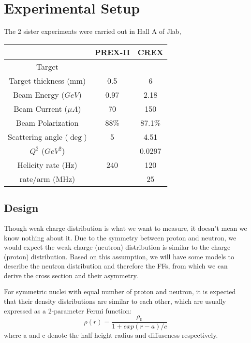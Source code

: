 \section{Experimental Setup}
The 2 sister experiments were carried out in Hall A of Jlab, 

\begin{table}[h]
    \centering
    \begin{tabular}{c | c c }
	\hline
	&   PREX-II & CREX  \\
	\hline
	Target	& \Pb	& \Ca	\\
	Target thickness (mm)	& 0.5	& 6	\\
	\hline
	Beam Energy ($GeV$) & 0.97 & 2.18  \\
	Beam Current ($\mu A$)	& 70	& 150	\\
	Beam Polarization & 88\%   & 87.1\%   \\
	Scattering angle ($\deg$)   & 5	& 4.51 \\
	$Q^2$ ($GeV^2$)	&   & 0.0297	\\
	Helicity rate (Hz)  & 240   & 120   \\
	rate/arm (MHz)	&   & 25    \\
	\hline
    \end{tabular}
\end{table}

\subsection{Design}
Though weak charge distribution is what we want to measure, it doesn't mean we
know nothing about it. Due to the symmetry between proton and neutron, we would
expect the weak charge (neutron) distribution is similar to the charge (proton)
distribution. Based on this assumption, we will have some models to describe
the neutron distribution and therefore the FFs, from which we can derive the
cross section and their asymmetry.

For symmetric nuclei with equal number of proton and neutron, it is expected 
that their density distributions are similar to each other, which are usually
expressed as a 2-parameter Fermi function:
\begin{equation}
    \rho(r) = \frac{\rho_0}{1 + exp(r-a)/c}
\end{equation}
where a and c denote the half-height radius and diffuseness respectively. 

